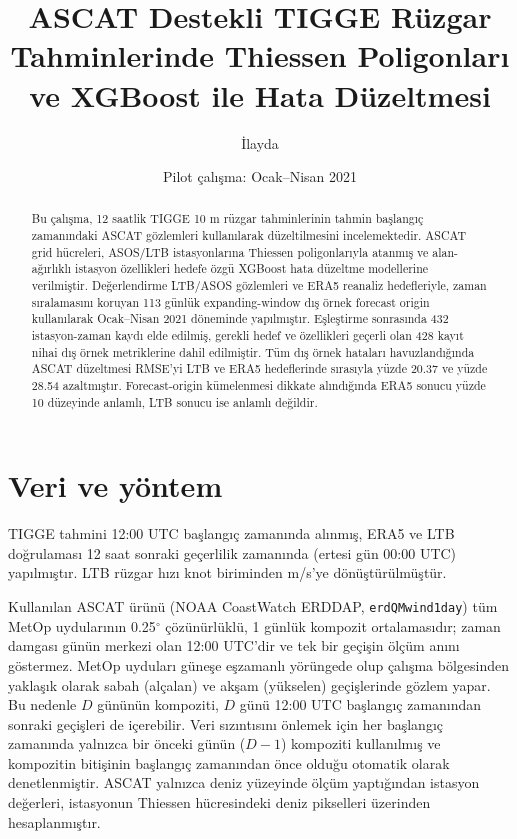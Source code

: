\documentclass[11pt,a4paper]{article}
\title{ASCAT Destekli TIGGE Rüzgar Tahminlerinde Thiessen Poligonları ve XGBoost ile Hata Düzeltmesi}
\author{İlayda}
\date{Pilot çalışma: Ocak--Nisan 2021}
\begin{document}
\maketitle

\begin{abstract}
Bu çalışma, 12 saatlik TIGGE 10 m rüzgar tahminlerinin tahmin başlangıç zamanındaki ASCAT gözlemleri kullanılarak düzeltilmesini incelemektedir. ASCAT grid hücreleri, ASOS/LTB istasyonlarına Thiessen poligonlarıyla atanmış ve alan-ağırlıklı istasyon özellikleri hedefe özgü XGBoost hata düzeltme modellerine verilmiştir. Değerlendirme LTB/ASOS gözlemleri ve ERA5 reanaliz hedefleriyle, zaman sıralamasını koruyan 113 günlük expanding-window dış örnek forecast origin kullanılarak Ocak--Nisan 2021 döneminde yapılmıştır. Eşleştirme sonrasında 432 istasyon-zaman kaydı elde edilmiş, gerekli hedef ve özellikleri geçerli olan 428 kayıt nihai dış örnek metriklerine dahil edilmiştir. Tüm dış örnek hataları havuzlandığında ASCAT düzeltmesi RMSE'yi LTB ve ERA5 hedeflerinde sırasıyla yüzde 20.37 ve yüzde 28.54 azaltmıştır. Forecast-origin kümelenmesi dikkate alındığında ERA5 sonucu yüzde 10 düzeyinde anlamlı, LTB sonucu ise anlamlı değildir.
\end{abstract}

\section{Veri ve yöntem}
TIGGE tahmini 12:00 UTC başlangıç zamanında alınmış, ERA5 ve LTB doğrulaması 12 saat sonraki geçerlilik zamanında (ertesi gün 00:00 UTC) yapılmıştır. LTB rüzgar hızı knot biriminden m/s'ye dönüştürülmüştür.

Kullanılan ASCAT ürünü (NOAA CoastWatch ERDDAP, \texttt{erdQMwind1day}) tüm MetOp uydularının 0.25$^\circ$ çözünürlüklü, 1 günlük kompozit ortalamasıdır; zaman damgası günün merkezi olan 12:00 UTC'dir ve tek bir geçişin ölçüm anını göstermez. MetOp uyduları güneşe eşzamanlı yörüngede olup çalışma bölgesinden yaklaşık olarak sabah (alçalan) ve akşam (yükselen) geçişlerinde gözlem yapar. %
Bu nedenle $D$ gününün kompoziti, $D$ günü 12:00 UTC başlangıç zamanından sonraki geçişleri de içerebilir. Veri sızıntısını önlemek için her başlangıç zamanında yalnızca bir önceki günün ($D-1$) kompoziti kullanılmış ve kompozitin bitişinin başlangıç zamanından önce olduğu otomatik olarak denetlenmiştir. ASCAT yalnızca deniz yüzeyinde ölçüm yaptığından istasyon değerleri, istasyonun Thiessen hücresindeki deniz pikselleri üzerinden hesaplanmıştır.
\end{document}
